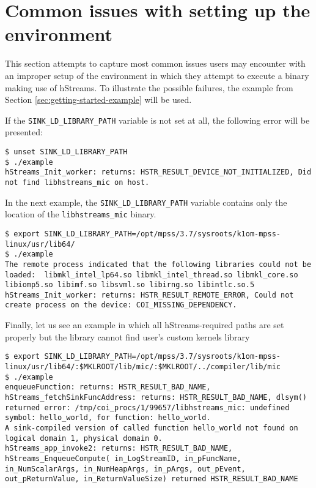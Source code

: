 \documentclass[a4,oneside]{book}
\newcommand{\hstreams}{hStreams}
\begin{document}
\section{Common issues with setting up the environment}
This section attempts to capture most common issues users may encounter with an improper setup of the environment in which they attempt to execute a binary making use of \hstreams.
To illustrate the possible failures, the example from Section \ref{sec:getting-started-example} will be used.

If the \texttt{SINK\_LD\_LIBRARY\_PATH} variable is not set at all, the following error will be presented:
\begin{lstlisting}[style=BashCmdListingStyle,caption={Running the example without \texttt{SINK\_LD\_LIBRARY\_PATH}},frame=tlrb,label={lst:example-nosinkld}]
$ unset SINK_LD_LIBRARY_PATH
$ ./example
hStreams_Init_worker: returns: HSTR_RESULT_DEVICE_NOT_INITIALIZED, Did not find libhstreams_mic on host.
\end{lstlisting}

In the next example, the \texttt{SINK\_LD\_LIBRARY\_PATH} variable contains only the location of the \texttt{libhstreams\_mic} binary.
\begin{lstlisting}[style=BashCmdListingStyle,caption={Running the example with incomplete \texttt{SINK\_LD\_LIBRARY\_PATH}},frame=tlrb,label={lst:example-incompletesinkld0}]
$ export SINK_LD_LIBRARY_PATH=/opt/mpss/3.7/sysroots/k1om-mpss-linux/usr/lib64/
$ ./example
The remote process indicated that the following libraries could not be loaded:  libmkl_intel_lp64.so libmkl_intel_thread.so libmkl_core.so libiomp5.so libimf.so libsvml.so libirng.so libintlc.so.5
hStreams_Init_worker: returns: HSTR_RESULT_REMOTE_ERROR, Could not create process on the device: COI_MISSING_DEPENDENCY.
\end{lstlisting}

Finally, let us see an example in which all \hstreams-required paths are set properly but the library cannot find user's custom kernels library
\begin{lstlisting}[style=BashCmdListingStyle,caption={Running the example with user's custom kernels library location missing from \texttt{SINK\_LD\_LIBRARY\_PATH}},frame=tlrb,label={lst:example-incompletesinkld1}]
$ export SINK_LD_LIBRARY_PATH=/opt/mpss/3.7/sysroots/k1om-mpss-linux/usr/lib64/:$MKLROOT/lib/mic/:$MKLROOT/../compiler/lib/mic
$ ./example
enqueueFunction: returns: HSTR_RESULT_BAD_NAME, hStreams_fetchSinkFuncAddress: returns: HSTR_RESULT_BAD_NAME, dlsym() returned error: /tmp/coi_procs/1/99657/libhstreams_mic: undefined symbol: hello_world, for function: hello_world.
A sink-compiled version of called function hello_world not found on logical domain 1, physical domain 0.
hStreams_app_invoke2: returns: HSTR_RESULT_BAD_NAME, hStreams_EnqueueCompute( in_LogStreamID, in_pFuncName, in_NumScalarArgs, in_NumHeapArgs, in_pArgs, out_pEvent, out_pReturnValue, in_ReturnValueSize) returned HSTR_RESULT_BAD_NAME
\end{lstlisting}
\end{document}
